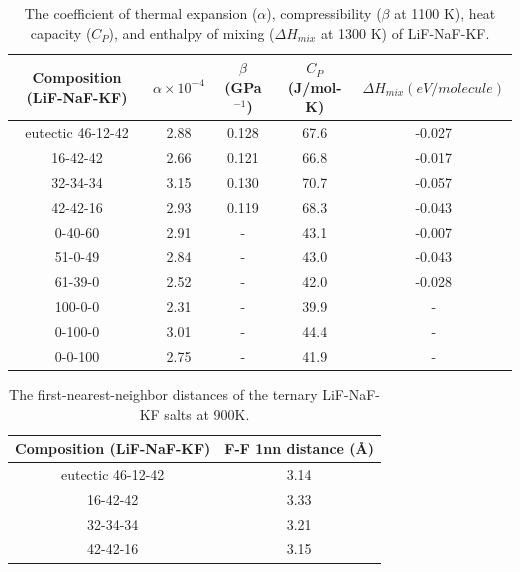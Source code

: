 \documentclass[preprint,12pt]{elsarticle}
\begin{document}
\begin{table}[h]
\centering
\caption{The coefficient of thermal expansion ($\alpha$), compressibility ($\beta$ at 1100 K), heat capacity ($C_P$), and enthalpy of mixing ($\Delta H_{mix}$ at 1300 K) of LiF-NaF-KF.}
\begin{tabular}{|c|c|c|c|c|}
\hline
Composition (LiF-NaF-KF) & $\alpha \times10^{-4}$ & $\beta$ (GPa$^{-1}$) & $C_P$ (J/mol-K) & $\Delta H_{mix} (eV/molecule)$ \\
\hline
eutectic 46-12-42 & 2.88 & 0.128 & 67.6 & -0.027\\
16-42-42 & 2.66 & 0.121 & 66.8 & -0.017 \\
32-34-34 & 3.15 & 0.130 & 70.7  & -0.057 \\
42-42-16 & 2.93 & 0.119 & 68.3 & -0.043  \\
0-40-60  & 2.91 & - &  43.1 & -0.007   \\
51-0-49  & 2.84 & - &  43.0 & -0.043  \\
61-39-0  & 2.52 & - &  42.0 & -0.028 \\
100-0-0  & 2.31 & - &  39.9 & -  \\
0-100-0  & 3.01 & - &  44.4 & - \\
0-0-100  & 2.75 & - &  41.9 & -  \\
\hline
\end{tabular}
\label{tab:append_prop}
\end{table}
\FloatBarrier


\begin{table}[h]
\centering
\caption{The first-nearest-neighbor distances of the ternary LiF-NaF-KF salts at 900K.}
\begin{tabular}{|c|c|}
\hline
Composition (LiF-NaF-KF) & F-F 1nn distance (\AA) \\
\hline
eutectic 46-12-42 & 3.14 \\
16-42-42 & 3.33 \\
32-34-34 & 3.21 \\
42-42-16 & 3.15  \\
\hline
\end{tabular}
\label{tab:append_1nn}
\end{table}

\FloatBarrier

 

\end{document}
